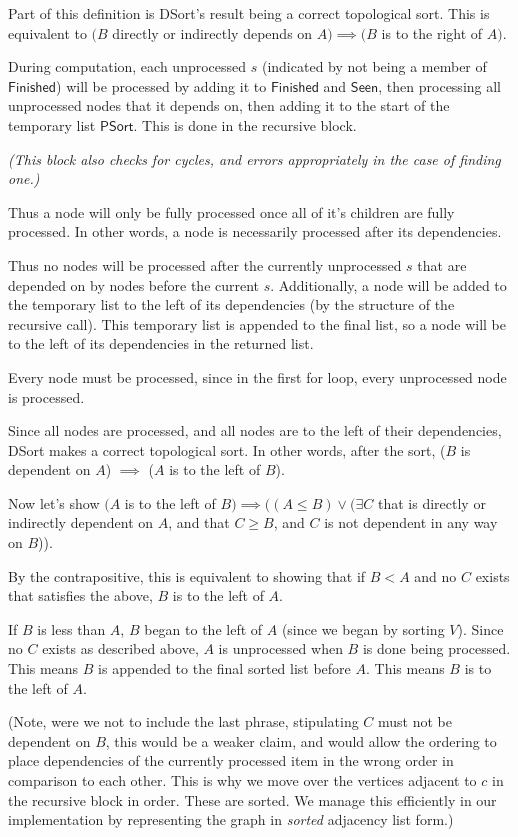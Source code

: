 \documentclass{article}
\begin{document}
Part of this definition is DSort's result being a correct topological sort.  This is equivalent to $(B$ directly or indirectly depends on $A) \implies (B$ is to the right of $A).$

During computation, each unprocessed $s$ (indicated by not being a member of $\mathsf{Finished}$) will be processed by  adding it to $\mathsf{Finished}$ and $\mathsf{Seen}$, then processing all unprocessed nodes that it depends on, then adding it to the start of the temporary list $\mathsf{PSort}$.  This is done in the recursive block.

\textit{(This block also checks for cycles, and errors appropriately in the case of finding one.)}

Thus a node will only be fully processed once all of it's children are fully processed.  In other words, a node is necessarily processed after its dependencies.

Thus no nodes will be processed after the currently unprocessed $s$ that are depended on by nodes before the current $s$.  Additionally, a node will be added to the temporary list to the left of its dependencies (by the structure of the recursive call).  This temporary list is appended to the final list, so a node will be to the left of its dependencies in the returned list.

Every node must be processed, since in the first for loop, every unprocessed node is processed.

Since all nodes are processed, and all nodes are to the left of their dependencies, DSort makes a correct topological sort.  In other words, after the sort, ($B$ is dependent on $A$) $\implies$ ($A$ is to the left of $B$).

\bigskip

Now let's show $(A$ is to the left of $B) \implies ((A\leq B) \lor (\exists C$ that is directly or indirectly dependent on $A$, and that $C \geq B$, and $C$ is not dependent in any way on $B$)).

By the contrapositive, this is equivalent to showing that if $B < A$ and no $C$ exists that satisfies the above, $B$ is to the left of $A$.

If $B$ is less than $A$, $B$ began to the left of $A$ (since we began by sorting $V$).  Since no $C$ exists as described above, $A$ is unprocessed when $B$ is done being processed.  This means $B$ is appended to the final sorted list before $A$.  This means $B$ is to the left of $A$.

(Note, were we not to include the last phrase, stipulating $C$ must not be dependent on $B$, this would be a weaker claim, and would allow the ordering to place dependencies of the currently processed item in the wrong order in comparison to each other.  This is why we move over the vertices adjacent to $c$ in the recursive block in order.  These are sorted.  We manage this efficiently in our implementation by representing the graph in \textit{sorted} adjacency list form.)
\end{document}

